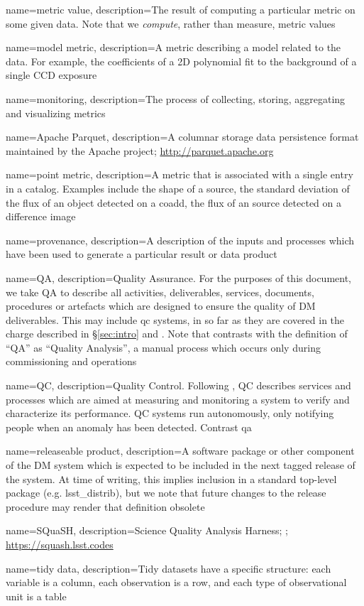 {
  name={metric value},
  description={The result of computing a particular \gls{metric} on some given
  data. Note that we \textit{compute}, rather than measure, metric values}
}

{
  name={model metric},
  description={A \gls{metric} describing a model related to the data. For
  example, the coefficients of a 2D polynomial fit to the background of a
  single CCD exposure}
}

{
  name={monitoring},
  description={The process of collecting, storing, aggregating and visualizing
  metrics}
}

{
  name={Apache Parquet},
  description={A columnar storage data persistence format maintained by the
  Apache project; \url{http://parquet.apache.org}}
}

{
  name={point metric},
  description={A \gls{metric} that is associated with a single entry in a
  catalog. Examples include the shape of a source, the standard deviation of
  the flux of an object detected on a coadd, the flux of an source detected on
  a difference image}
}

{
  name={provenance},
  description={A description of the inputs and processes which have been used
  to generate a particular result or data product}
}

{
  name={QA},
  description={Quality Assurance. For the purposes of this document, we take
  QA to describe all activities, deliverables, services, documents, procedures
  or artefacts which are designed to ensure the quality of DM deliverables.
  This may include \gls{qc} systems, in so far as they are covered in the
  charge described in \S\ref{sec:intro} and . Note that
  contrasts with the  definition of ``QA'' as ``Quality
  Analysis'', a manual process which occurs only during commissioning and
  operations}
}

{
  name={QC},
  description={Quality Control. Following , QC describes
  services and processes which are aimed at measuring and monitoring a system
  to verify and characterize its performance. QC systems run autonomously,
  only notifying people when an anomaly has been detected. Contrast \gls{qa}}
}

{
  name={releaseable product},
  description={A software package or other component of the DM system which
  is expected to be included in the next tagged release of the system. At time
  of writing, this implies inclusion in a standard top-level package
  (e.g. lsst\_distrib), but we note that future changes to the release procedure
  may render that definition obsolete}
}

{
  name={SQuaSH},
  description={Science Quality Analysis Harness; ;
  \url{https://squash.lsst.codes}}
}

{
  name={tidy data},
  description={Tidy datasets have a specific structure: each variable is a
  column, each observation is a row, and each type of observational unit is a
  table \citep{JSSv059i10}}
}
